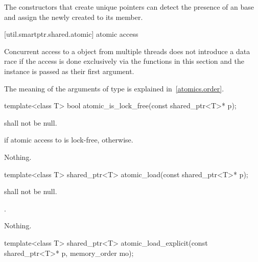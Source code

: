 \pnum
The  constructors that create unique pointers
can detect the presence of an  base and
assign the newly created  to its 
member. \exitnote

[util.smartptr.shared.atomic]{ atomic access}

\pnum
Concurrent access to a  object from multiple threads does not
introduce a data race if the access is done exclusively via the functions in
this section and the instance is passed as their first argument.

\pnum
The meaning of the arguments of type  is explained in~\ref{atomics.order}.

%
%
\begin{itemdecl}
template<class T>
  bool atomic_is_lock_free(const shared_ptr<T>* p);
\end{itemdecl}

\begin{itemdescr}
\pnum
\requires {} shall not be null.

\pnum
\returns {} if atomic access to  is lock-free,  otherwise.

\pnum
\throws Nothing.
\end{itemdescr}

%
%
\begin{itemdecl}
template<class T>
  shared_ptr<T> atomic_load(const shared_ptr<T>* p);
\end{itemdecl}

\begin{itemdescr}
\pnum
\requires {} shall not be null.

\pnum
\returns {}.

\pnum
\throws Nothing.
\end{itemdescr}

%
%
\begin{itemdecl}
template<class T>
  shared_ptr<T> atomic_load_explicit(const shared_ptr<T>* p, memory_order mo);
\end{itemdecl}

